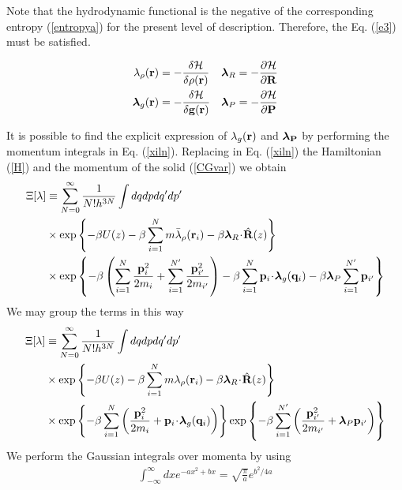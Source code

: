 \documentclass[b5paper,openright,11pt]{book}
\newcommand{\esc}{\!\cdot\!}
\begin{document}
Note that the hydrodynamic functional  is the negative of the corresponding entropy (\ref{entropya}) for the present level of description. Therefore, the Eq. (\ref{e3}) must be satisfied.

\begin{align}
  \lambda_\rho({\bf r}) &=-\frac{\delta {\cal H}}{\delta \rho({\bf r}) }
&&  \boldsymbol{\lambda}_R =-\frac{\partial {\cal H}}{\partial {\bf R} }
\nonumber\\
  \boldsymbol{\lambda}_g({\bf r}) &=-\frac{\delta {\cal H}}{\delta {\bf g}({\bf r}) }
&&  \boldsymbol{\lambda}_P =-\frac{\partial {\cal H}}{\partial{\bf P} }
\label{lno}
\end{align}

It is possible to find the explicit expression of $\lambda_{g}({\bf r})$ and $\boldsymbol{\lambda}_{\bf P}$ by performing the momentum integrals in Eq. (\ref{xiln}). Replacing in Eq. (\ref{xiln}) the Hamiltonian (\ref{H}) and the momentum of the solid (\ref{CGvar}) we obtain 
\begin{align}
\Xi[\lambda]
&\equiv
\sum_{N=0}^\infty \frac{1}{N!h^{3N}}
\int dqdpdq'dp'
\nonumber \\
&\times\exp\left\{-\beta U(z)-\beta \sum_{i=1}^Nm\bar{\lambda}_\rho({\bf
    r}_i) -\beta \boldsymbol{\lambda}_{R}\esc\hat{\bf R}(z) \right\}
\nonumber \\
&\times
\exp\left\{-\beta \left(\sum_{i=1}^N\frac{{\bf p}_i^2}{2m_i} + \sum_{i=1}^{N'}\frac{{\bf p}_{i'}^2}{2m_{i'}} \right) - \beta \sum_{i=1}^N{\bf p}_i\esc\boldsymbol{\lambda}_g({\bf q}_i) 
-\beta \boldsymbol{\lambda}_P\sum_{i=1}^{N'}{\bf p}_{i'}\right\}
\end{align}
We may group the terms in this way
\begin{align}
\Xi[\lambda]
&\equiv
\sum_{N=0}^\infty \frac{1}{N!h^{3N}}
\int dqdpdq'dp'
\nonumber \\
&\times\exp\left\{-\beta U(z)-\beta \sum_{i=1}^Nm\lambda_\rho({\bf
    r}_i) -\beta \boldsymbol{\lambda}_{R}\esc\hat{\bf R}(z) \right\}
\nonumber \\
&\times
\exp\left\{-\beta \sum_{i=1}^N\left(\frac{{\bf p}_i^2}{2m_i} + {\bf p}_i\esc\boldsymbol{\lambda}_g({\bf q}_i)\right)\right\}
\exp\left\{-\beta \sum_{i=1}^{N'}\left(\frac{{\bf p}_{i'}^2}{2m_{i'}} + \boldsymbol{\lambda}_P{\bf p}_{i'}\right) \right\}
\end{align}
We perform the Gaussian integrals over momenta by using 
\begin{align}
\int_{-\infty}^{\infty} dx e^{-ax^2+bx}=\sqrt{\frac{\pi}{a}}e^{b^2/4a} 
\end{align}
\end{document}
